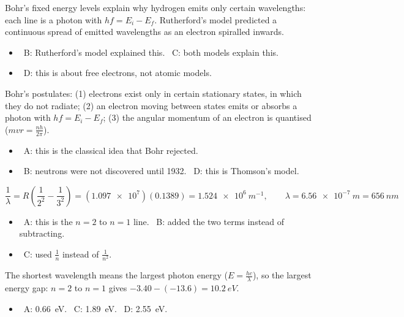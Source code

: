 \documentclass[12pt]{article}
\begin{document}
\begin{practiceanswers}
\begin{practiceans}
  Bohr's fixed energy levels explain why hydrogen emits only certain wavelengths: each line is a photon
  with $hf = E_i - E_f$. Rutherford's model predicted a continuous spread of emitted wavelengths as an
  electron spiralled inwards.
  \begin{itemize}
    \item \xmark\ B: Rutherford's model explained this. \quad \xmark\ C: both models explain this.
    \item \xmark\ D: this is about free electrons, not atomic models.
  \end{itemize}
\end{practiceans}

\begin{practiceans}
  Bohr's postulates: (1) electrons exist only in certain stationary states, in which they do not radiate;
  (2) an electron moving between states emits or absorbs a photon with $hf = E_i - E_f$; (3) the angular
  momentum of an electron is quantised ($mvr = \frac{nh}{2\pi}$).
  \begin{itemize}
    \item \xmark\ A: this is the classical idea that Bohr rejected.
    \item \xmark\ B: neutrons were not discovered until 1932. \quad \xmark\ D: this is Thomson's model.
  \end{itemize}
\end{practiceans}

\begin{practiceans}
  \[ \frac{1}{\lambda} = R\left(\frac{1}{2^2} - \frac{1}{3^2}\right) = (\num{1.097e7})(0.1389) = \qty{1.524e6}{m^{-1}},
     \qquad \lambda = \qty{6.56e-7}{m} = \qty{656}{nm} \]
  \begin{itemize}
    \item \xmark\ A: this is the $n = 2$ to $n = 1$ line. \quad \xmark\ B: added the two terms instead of
          subtracting.
    \item \xmark\ C: used $\frac{1}{n}$ instead of $\frac{1}{n^2}$.
  \end{itemize}
\end{practiceans}

\begin{practiceans}
  The shortest wavelength means the largest photon energy ($E = \frac{hc}{\lambda}$), so the largest energy
  gap: $n = 2$ to $n = 1$ gives $-3.40 - (-13.6) = \qty{10.2}{eV}$.
  \begin{itemize}
    \item \xmark\ A: \qty{0.66}{eV}. \quad \xmark\ C: \qty{1.89}{eV}. \quad \xmark\ D: \qty{2.55}{eV}.
  \end{itemize}
\end{practiceans}


\end{practiceanswers}
\end{document}
